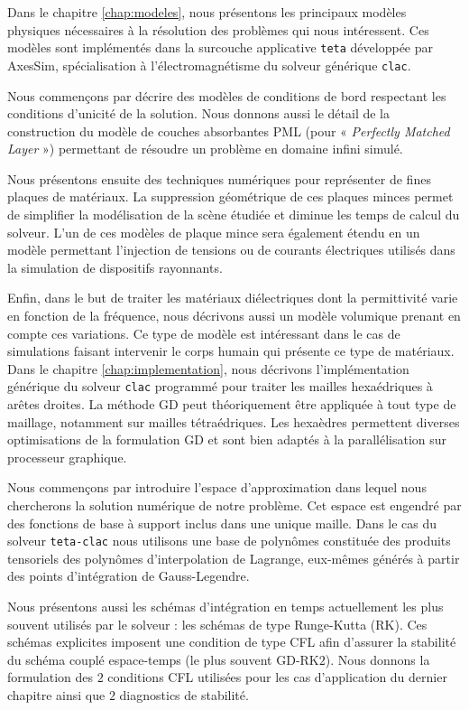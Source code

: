 Dans le chapitre \ref{chap:modeles}, nous présentons les
principaux modèles physiques nécessaires à la résolution
des problèmes qui nous intéressent.
Ces modèles sont implémentés dans la surcouche applicative
\texttt{teta} développée par AxesSim, spécialisation à l'électromagnétisme
du solveur générique \texttt{clac}.

Nous commençons par décrire des modèles de conditions
de bord respectant les conditions d'unicité de la
solution.
Nous donnons aussi le détail de la construction
du modèle de couches absorbantes PML
(pour « \textit{Perfectly Matched Layer} »)
permettant de résoudre un problème en domaine infini simulé.

Nous présentons ensuite des techniques numériques pour représenter
de fines plaques de matériaux.
La suppression géométrique de ces plaques minces
permet de simplifier la modélisation de la scène
étudiée et diminue les temps de calcul du solveur.
L'un de ces modèles de plaque mince sera également étendu en un
modèle permettant l'injection de tensions ou de courants
électriques utilisés dans la simulation de dispositifs rayonnants.

Enfin, dans le but de traiter les matériaux diélectriques dont la
permittivité varie en fonction de la
fréquence,
nous décrivons aussi un modèle volumique prenant en compte ces
variations.
Ce type de modèle est intéressant dans le cas de simulations
faisant intervenir le corps humain qui présente ce type de matériaux.
\\



Dans le chapitre \ref{chap:implementation}, nous décrivons
l'implémentation générique du solveur \texttt{clac}
programmé pour traiter les mailles hexaédriques à arêtes droites.
La méthode GD peut théoriquement être appliquée à
tout type de maillage, notamment sur mailles tétraédriques.
Les hexaèdres permettent diverses optimisations de la formulation GD et
sont bien adaptés à la parallélisation sur processeur graphique.

Nous commençons par introduire l'espace d'approximation
dans lequel nous chercherons la solution numérique de notre problème.
Cet espace est engendré par des fonctions de base à support
inclus dans une unique maille.
Dans le cas du solveur \texttt{teta-clac} nous utilisons
une base de polynômes constituée
des produits tensoriels des polynômes d'interpolation de Lagrange,
eux-mêmes générés à partir des points d'intégration de Gauss-Legendre.

Nous présentons aussi les schémas d'intégration en temps
actuellement les plus souvent utilisés par le solveur :
les schémas de type Runge-Kutta (RK).
Ces schémas explicites imposent une condition
 de type CFL afin d'assurer
la stabilité du schéma couplé espace-temps (le plus
souvent GD-RK$2$).
Nous donnons la formulation des $2$
conditions CFL utilisées pour les cas d'application
du dernier chapitre ainsi que $2$ diagnostics de stabilité.
\\




